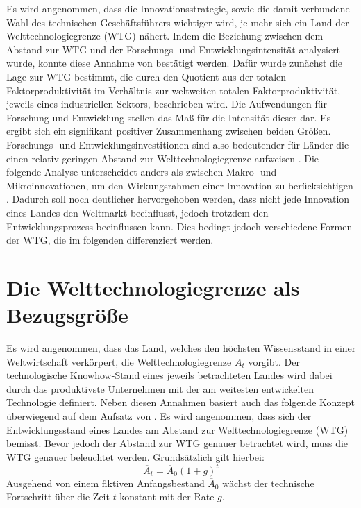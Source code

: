 Es wird angenommen, dass die Innovationsstrategie, sowie die damit verbundene Wahl des technischen Geschäftsführers wichtiger wird, je mehr sich ein Land der Welttechnologiegrenze (WTG) nähert. Indem die Beziehung zwischen dem Abstand zur WTG und der Forschungs- und Entwicklungsintensit{\"a}t analysiert wurde, konnte diese Annahme von \citet{Griffith.2004} best{\"a}tigt werden. Dafür wurde zunächst die Lage zur WTG bestimmt, die durch den Quotient aus der totalen Faktorproduktivit{\"a}t im Verh{\"a}ltnis zur weltweiten totalen Faktorproduktivit{\"a}t, jeweils eines industriellen Sektors, beschrieben wird. Die Aufwendungen f{\"u}r Forschung und Entwicklung stellen das Ma{\ss} f{\"u}r die Intensit{\"a}t dieser dar. Es ergibt sich ein signifikant positiver Zusammenhang zwischen beiden Gr{\"o}{\ss}en. Forschungs- und Entwicklungsinvestitionen sind also bedeutender f{\"u}r L{\"a}nder die einen relativ geringen Abstand zur Welttechnologiegrenze aufweisen \citep{Acemoglu.2006}.\newline
Die folgende Analyse unterscheidet anders als \citet{Acemoglu.2006} zwischen Makro- und Mikroinnovationen, um den Wirkungsrahmen einer Innovation zu berücksichtigen \citep{Mokyr.1990}. Dadurch soll noch deutlicher hervorgehoben werden, dass nicht jede Innovation eines Landes den Weltmarkt beeinflusst, jedoch trotzdem den Entwicklungsprozess beeinflussen kann. Dies bedingt jedoch verschiedene Formen der WTG, die im folgenden differenziert werden.


\section{Die Welttechnologiegrenze als Bezugsgrö{\ss}e}\label{WTG}


Es wird angenommen, dass das Land, welches den höchsten Wissensstand in einer Weltwirtschaft verkörpert, die Welttechnologiegrenze $\overline {A}_t$ vorgibt. Der technologische Knowhow-Stand eines jeweils betrachteten Landes wird dabei durch das produktivste Unternehmen mit der am weitesten entwickelten Technologie definiert. 
Neben diesen Annahmen basiert auch das folgende Konzept überwiegend auf dem Aufsatz von \citet{Acemoglu.2006}. Es wird angenommen, dass sich der Entwicklungsstand eines Landes am Abstand zur Welttechnologiegrenze (WTG) bemisst. Bevor jedoch der Abstand zur WTG genauer betrachtet wird, muss die WTG genauer beleuchtet werden. Grundsätzlich gilt hierbei:
\begin{equation}\overline{A}_t=\overline{A}_0(1+g)^t\label{exogene WTG}\end{equation}
Ausgehend von einem fiktiven Anfangsbestand $\overline{A}_0$ wächst der technische Fortschritt über die Zeit $t$ konstant mit der Rate $g$.\\ 


